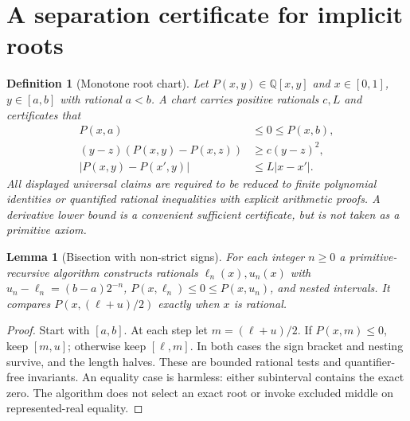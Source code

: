 \documentclass[11pt]{article}
\newtheorem{lemma}[theorem]{Lemma}
\newtheorem{definition}[theorem]{Definition}
\newcommand{\Q}{\mathbb Q}\newcommand{\N}{\mathbb N}\newcommand{\ipra}{\mathrm{iPRA}}
\begin{document}
\section{A separation certificate for implicit roots}
\begin{definition}[Monotone root chart]
Let $P(x,y)\in\Q[x,y]$ and $x\in[0,1]$, $y\in[a,b]$ with rational $a<b$. A chart carries positive rationals $c,L$ and certificates that
\begin{align}
P(x,a)&\le0\le P(x,b),\\
(y-z)(P(x,y)-P(x,z))&\ge c(y-z)^2,\label{eq:sep}\\
|P(x,y)-P(x',y)|&\le L|x-x'|.
\end{align}
All displayed universal claims are required to be reduced to finite polynomial identities or quantified rational inequalities with explicit arithmetic proofs. A derivative lower bound is a convenient sufficient certificate, but is not taken as a primitive axiom.
\end{definition}

\begin{lemma}[Bisection with non-strict signs]\label{lem:bisect}
For each integer $n\ge0$ a primitive-recursive algorithm constructs rationals $\ell_n(x),u_n(x)$ with $u_n-\ell_n=(b-a)2^{-n}$, $P(x,\ell_n)\le0\le P(x,u_n)$, and nested intervals. It compares $P(x,(\ell+u)/2)$ exactly when $x$ is rational.
\end{lemma}
\begin{proof}
Start with $[a,b]$. At each step let $m=(\ell+u)/2$. If $P(x,m)\le0$, keep $[m,u]$; otherwise keep $[\ell,m]$. In both cases the sign bracket and nesting survive, and the length halves. These are bounded rational tests and quantifier-free invariants. An equality case is harmless: either subinterval contains the exact zero. The algorithm does not select an exact root or invoke excluded middle on represented-real equality.
\end{proof}
\end{document}

